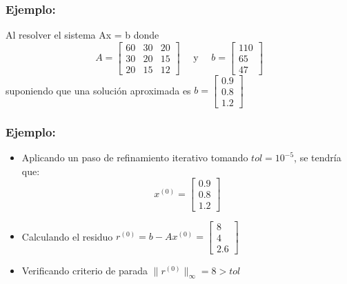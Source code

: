 \documentclass[10pt]{beamer}
\begin{document}
  \begin{frame}
    \frametitle{Ejemplo:}
    Al resolver el sistema Ax = b donde
    $$
    A = \left[\begin{array}{ccc}
      60 & 30 & 20\\
      30 & 20 & 15\\
      20 & 15 & 12
    \end{array}\right] \quad \text{ y } \quad b = \left[\begin{array}{c}
      110\\
      65\\
      47
    \end{array}\right]
    $$
    suponiendo que una soluci\'on aproximada es $b = \left[\begin{array}{c}
      0.9\\
      0.8\\
      1.2
    \end{array}\right]$
  \end{frame}
  \begin{frame}
    \frametitle{Ejemplo:}
    \begin{itemize}
    \item Aplicando un paso de refinamiento iterativo tomando $tol = 10^{-5}$, se tendr\'ia que:
    $$
    x^{(0)} = \left[\begin{array}{c}
      0.9\\
      0.8\\
      1.2
    \end{array}\right]
    $$
    \item<2-> Calculando el residuo $r^{(0)} = b - Ax^{(0)} = \left[\begin{array}{c}
      8\\
      4\\
      2.6
    \end{array}\right]$
    \item<3->Verificando criterio de parada $\|r^{(0)}\|_{\infty} = 8 > tol$
  \end{itemize}
  \end{frame}
\end{document}
